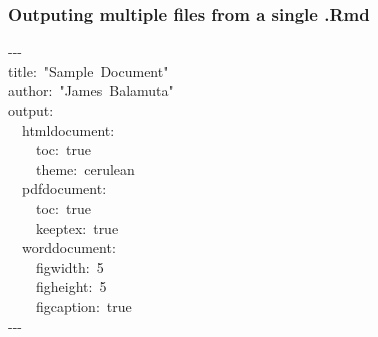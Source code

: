 \documentclass{beamer}\usepackage[]{graphicx}\usepackage[]{color}
\makeatletter
\newcommand{\hlnum}[1]{\textcolor[rgb]{0.686,0.059,0.569}{#1}}%
\newcommand{\hlstr}[1]{\textcolor[rgb]{0.192,0.494,0.8}{#1}}%
\newcommand{\hlopt}[1]{\textcolor[rgb]{0,0,0}{#1}}%
\newcommand{\hlstd}[1]{\textcolor[rgb]{0.345,0.345,0.345}{#1}}%
\newenvironment{kframe}{%
 \def\at@end@of@kframe{}%
 \ifinner\ifhmode%
  \def\at@end@of@kframe{\end{minipage}}%
  \begin{minipage}{\columnwidth}%
 \fi\fi%
 \def\FrameCommand##1{\hskip\@totalleftmargin \hskip-\fboxsep
 \colorbox{shadecolor}{##1}\hskip-\fboxsep
     \hskip-\linewidth \hskip-\@totalleftmargin \hskip\columnwidth}%
 \MakeFramed {\advance\hsize-\width
   \@totalleftmargin\z@ \linewidth\hsize
   \@setminipage}}%
 {\par\unskip\endMakeFramed%
 \at@end@of@kframe}
\newenvironment{knitrout}{}{} %
\makeatother
\begin{document}
\begin{frame}[fragile]
\frametitle{Outputing multiple files from a single .Rmd}
\begin{knitrout}
\color{fgcolor}\begin{kframe}
\noindent
\ttfamily
\hlstd{}\hlopt{{-}{-}{-}}\hspace*{\fill}\\
\hlstd{title}\hlopt{:\ }\hlstd{}\hlstr{"Sample\ Document"}\hlstd{\hspace*{\fill}\\
author}\hlopt{:\ }\hlstd{}\hlstr{"James\ Balamuta"}\hlstd{\hspace*{\fill}\\
output}\hlopt{:}\hspace*{\fill}\\
\hlstd{}\hlstd{\ \ }\hlstd{html\textunderscore document}\hlopt{:}\hspace*{\fill}\\
\hlstd{}\hlstd{\ \ \ \ }\hlstd{toc}\hlopt{:\ }\hlstd{true}\hlstd{\ \ \ \ \ \ \ \ \ \ \ \ }\hlstd{}\hspace*{\fill}\\
\hlstd{}\hlstd{\ \ \ \ }\hlstd{theme}\hlopt{:\ }\hlstd{cerulean}\hlstd{\ \ \ \ \ \ }\hlstd{}\hspace*{\fill}\\
\hlstd{}\hlstd{\ \ }\hlstd{pdf\textunderscore document}\hlopt{:}\hspace*{\fill}\\
\hlstd{}\hlstd{\ \ \ \ }\hlstd{toc}\hlopt{:\ }\hlstd{true}\hlstd{\ \ \ \ \ \ \ \ \ \ \ \ }\hlstd{}\hspace*{\fill}\\
\hlstd{}\hlstd{\ \ \ \ }\hlstd{keep\textunderscore tex}\hlopt{:\ }\hlstd{true}\hlstd{\ \ \ \ \ \ \ }\hlstd{}\hspace*{\fill}\\
\hlstd{}\hlstd{\ \ }\hlstd{word\textunderscore document}\hlopt{:}\hspace*{\fill}\\
\hlstd{}\hlstd{\ \ \ \ }\hlstd{fig\textunderscore width}\hlopt{:\ }\hlstd{}\hlnum{5}\hlstd{\ \ \ \ \ \ \ \ \ }\hlnum{}\hlstd{}\hspace*{\fill}\\
\hlstd{}\hlstd{\ \ \ \ }\hlstd{fig\textunderscore height}\hlopt{:\ }\hlstd{}\hlnum{5}\hlstd{\ \ \ \ \ \ \ \ }\hlnum{}\hlstd{}\hspace*{\fill}\\
\hlstd{}\hlstd{\ \ \ \ }\hlstd{fig\textunderscore caption}\hlopt{:\ }\hlstd{true}\hlstd{\ \ \ \ }\hlstd{}\hspace*{\fill}\\
\hlstd{}\hlopt{{-}{-}{-}}\hlstd{}\hspace*{\fill}
\mbox{}
\normalfont
\end{kframe}
\end{knitrout}
\end{frame}
\end{document}

